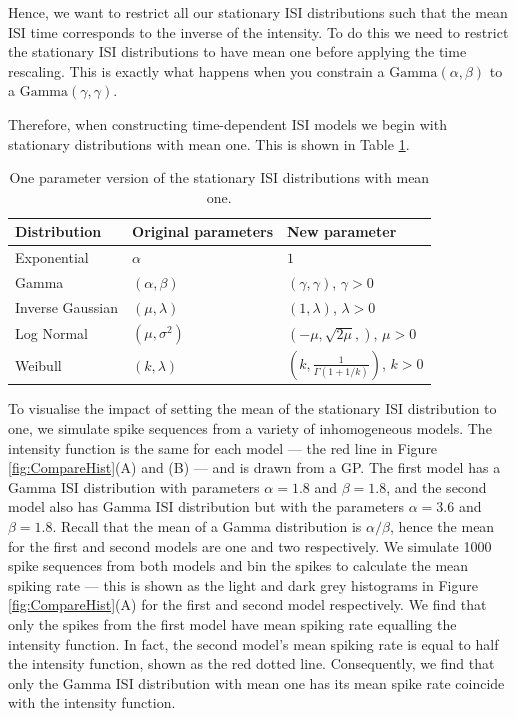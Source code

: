 \documentclass[oneside, 12 pt]{book}
\begin{document}
Hence, we want to restrict all our stationary ISI distributions such that the mean ISI time corresponds to the inverse of the intensity. To do this we need to restrict the stationary ISI distributions to have mean one before applying the time rescaling. This is exactly what happens when you constrain a $\mathrm{Gamma}(\alpha, \beta)$ to a $\mathrm{Gamma}(\gamma, \gamma)$.

Therefore, when constructing time-dependent ISI models we begin with stationary distributions with mean one. This is shown in Table \ref{table:oneparam}.

\begin{table}[h!]
  \begin{center}
    \begin{tabular}{|l|l|l|}
    \hline
     Distribution & Original parameters & New parameter  \\ \hline
     Exponential & $\alpha$ & $1$ \\
     Gamma & $(\alpha, \beta)$ & $(\gamma, \gamma)$, $\gamma >0$  \\
     Inverse Gaussian & $(\mu, \lambda)$ & $(1, \lambda)$, $\lambda > 0$  \\
     Log Normal & $(\mu, \sigma^2)$ & $(-\mu, \sqrt{2\mu},)$, $\mu > 0$   \\
     Weibull & $(k, \lambda)$ & $(k,\frac{1}{\Gamma(1+1/k)})$, $k > 0$ \\ \hline
    \end{tabular}
    \caption{One parameter version of the stationary ISI distributions with mean one. }
        \label{table:oneparam}
  \end{center}
\end{table} 

To visualise the impact of setting the mean of the stationary ISI distribution to one, we simulate spike sequences from a variety of inhomogeneous models. The intensity function is the same for each model --- the red line in Figure \ref{fig:CompareHist}(A) and (B) --- and is drawn from a GP. The first model has a Gamma ISI distribution with parameters $\alpha = 1.8$ and $\beta = 1.8$, and the second model also has Gamma ISI distribution but with the parameters $\alpha = 3.6$ and $\beta = 1.8$. Recall that the mean of a Gamma distribution is $\alpha / \beta$, hence the mean for the first and second models are one and two respectively. We simulate 1000 spike sequences from both models and bin the spikes to calculate the mean spiking rate --- this is shown as the light and dark grey histograms in Figure \ref{fig:CompareHist}(A) for the first and second model respectively.  We find that only the spikes from the first model have mean spiking rate equalling the intensity function. In fact, the second model's mean spiking rate is equal to half the intensity function, shown as the red dotted line. Consequently, we find that only the Gamma ISI distribution with mean one has its mean spike rate coincide with the intensity function. 
\end{document}
